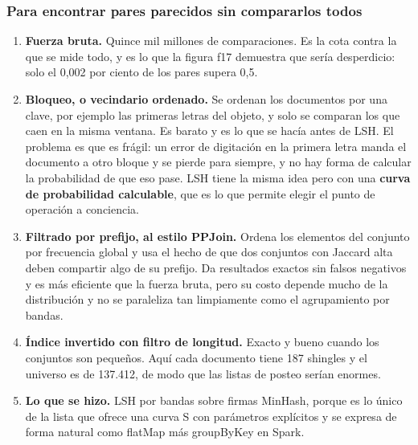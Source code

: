 \documentclass[11pt]{article}
\begin{document}
\subsubsection*{Para encontrar pares parecidos sin compararlos todos}
\begin{enumerate}
  \item \textbf{Fuerza bruta.} Quince mil millones de comparaciones. Es la cota contra la que se mide todo, y es lo que la figura f17 demuestra que sería desperdicio: solo el 0,002 por ciento de los pares supera 0,5.
  \item \textbf{Bloqueo, o vecindario ordenado.} Se ordenan los documentos por una clave, por ejemplo las primeras letras del objeto, y solo se comparan los que caen en la misma ventana. Es barato y es lo que se hacía antes de LSH. El problema es que es frágil: un error de digitación en la primera letra manda el documento a otro bloque y se pierde para siempre, y no hay forma de calcular la probabilidad de que eso pase. LSH tiene la misma idea pero con una \textbf{curva de probabilidad calculable}, que es lo que permite elegir el punto de operación a conciencia.
  \item \textbf{Filtrado por prefijo, al estilo PPJoin.} Ordena los elementos del conjunto por frecuencia global y usa el hecho de que dos conjuntos con Jaccard alta deben compartir algo de su prefijo. Da resultados exactos sin falsos negativos y es más eficiente que la fuerza bruta, pero su costo depende mucho de la distribución y no se paraleliza tan limpiamente como el agrupamiento por bandas.
  \item \textbf{Índice invertido con filtro de longitud.} Exacto y bueno cuando los conjuntos son pequeños. Aquí cada documento tiene 187 shingles y el universo es de 137.412, de modo que las listas de posteo serían enormes.
  \item \textbf{Lo que se hizo.} LSH por bandas sobre firmas MinHash, porque es lo único de la lista que ofrece una curva S con parámetros explícitos y se expresa de forma natural como flatMap más groupByKey en Spark.
\end{enumerate}
\end{document}
